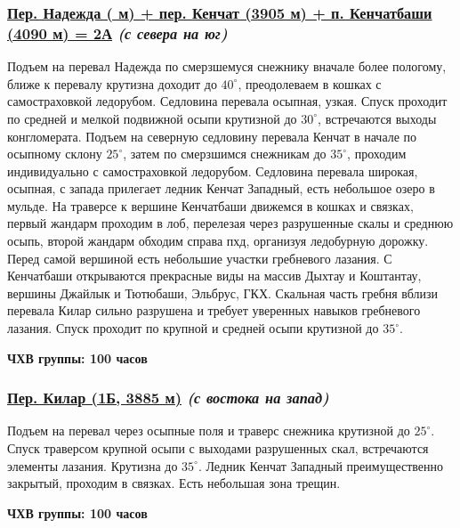 		\subsubsection*{%
			\hyperref[subsec:Day16]{Пер. Надежда ( м) + пер. Кенчат (3905 м) + п. Кенчатбаши (4090 м) = 2А}
			{\it (с севера на юг)}%
		}
			Подъем на перевал Надежда по смерзшемуся снежнику вначале более пологому, ближе к перевалу крутизна
			доходит до $40^\circ$, преодолеваем в кошках с самостраховкой ледорубом. Седловина перевала осыпная,
			узкая. Спуск проходит по средней и мелкой подвижной осыпи крутизной до $30^\circ$, встречаются выходы
			конгломерата. Подъем на северную седловину перевала Кенчат в начале по осыпному склону $25^\circ$,
			затем по смерзшимся снежникам до $35^\circ$, проходим индивидуально с самостраховкой ледорубом.
			Седловина перевала широкая, осыпная, с запада прилегает ледник Кенчат Западный, есть небольшое озеро
			в мульде. На траверсе к вершине Кенчатбаши движемся в кошках и связках, первый жандарм проходим в лоб,
			перелезая через разрушенные скалы и среднюю осыпь, второй жандарм обходим справа пхд, организуя
			ледобурную дорожку. Перед самой вершиной есть небольшие участки гребневого лазания. С Кенчатбаши
			открываются прекрасные виды на массив Дыхтау и Коштантау, вершины Джайлык и Тютюбаши, Эльбрус, ГКХ.
			Скальная часть гребня вблизи перевала Килар сильно разрушена и требует уверенных навыков гребневого
			лазания. Спуск проходит по крупной и средней осыпи крутизной до $35^\circ$.

			{\bf ЧХВ группы: 100 часов}

		\subsubsection*{%
			\hyperref[subsec:Day16]{Пер. Килар (1Б, 3885 м)}
			{\it (с востока на запад)}%
		}
			Подъем на перевал через осыпные поля и траверс снежника крутизной до $25^\circ$. Спуск траверсом
			крупной осыпи с выходами разрушенных скал, встречаются элементы лазания. Крутизна до $35^\circ$.
			Ледник Кенчат Западный преимущественно закрытый, проходим в связках. Есть небольшая зона трещин.
		
			{\bf ЧХВ группы: 100 часов}

